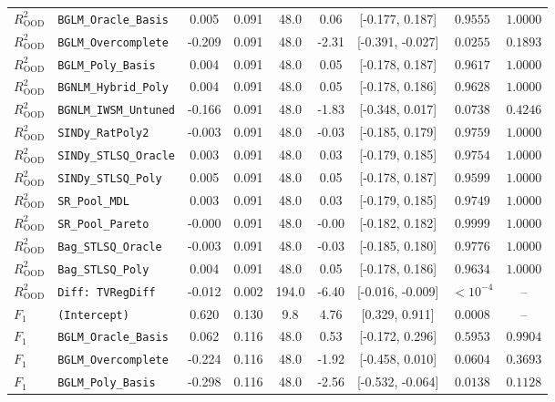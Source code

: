 \begin{table}[t]
\begin{tabular}{llccccccc}
$R^2_{\text{OOD}}$ & \texttt{BGLM\_Oracle\_Basis} & 0.005 & 0.091 & 48.0 & 0.06 & [-0.177, 0.187] & $0.9555$ & $1.0000$ \\
$R^2_{\text{OOD}}$ & \texttt{BGLM\_Overcomplete} & -0.209 & 0.091 & 48.0 & -2.31 & [-0.391, -0.027] & $0.0255$ & $0.1893$ \\
$R^2_{\text{OOD}}$ & \texttt{BGLM\_Poly\_Basis} & 0.004 & 0.091 & 48.0 & 0.05 & [-0.178, 0.187] & $0.9617$ & $1.0000$ \\
$R^2_{\text{OOD}}$ & \texttt{BGNLM\_Hybrid\_Poly} & 0.004 & 0.091 & 48.0 & 0.05 & [-0.178, 0.186] & $0.9628$ & $1.0000$ \\
$R^2_{\text{OOD}}$ & \texttt{BGNLM\_IWSM\_Untuned} & -0.166 & 0.091 & 48.0 & -1.83 & [-0.348, 0.017] & $0.0738$ & $0.4246$ \\
$R^2_{\text{OOD}}$ & \texttt{SINDy\_RatPoly2} & -0.003 & 0.091 & 48.0 & -0.03 & [-0.185, 0.179] & $0.9759$ & $1.0000$ \\
$R^2_{\text{OOD}}$ & \texttt{SINDy\_STLSQ\_Oracle} & 0.003 & 0.091 & 48.0 & 0.03 & [-0.179, 0.185] & $0.9754$ & $1.0000$ \\
$R^2_{\text{OOD}}$ & \texttt{SINDy\_STLSQ\_Poly} & 0.005 & 0.091 & 48.0 & 0.05 & [-0.178, 0.187] & $0.9599$ & $1.0000$ \\
$R^2_{\text{OOD}}$ & \texttt{SR\_Pool\_MDL} & 0.003 & 0.091 & 48.0 & 0.03 & [-0.179, 0.185] & $0.9749$ & $1.0000$ \\
$R^2_{\text{OOD}}$ & \texttt{SR\_Pool\_Pareto} & -0.000 & 0.091 & 48.0 & -0.00 & [-0.182, 0.182] & $0.9999$ & $1.0000$ \\
$R^2_{\text{OOD}}$ & \texttt{Bag\_STLSQ\_Oracle} & -0.003 & 0.091 & 48.0 & -0.03 & [-0.185, 0.180] & $0.9776$ & $1.0000$ \\
$R^2_{\text{OOD}}$ & \texttt{Bag\_STLSQ\_Poly} & 0.004 & 0.091 & 48.0 & 0.05 & [-0.178, 0.186] & $0.9634$ & $1.0000$ \\
$R^2_{\text{OOD}}$ & \texttt{Diff: TVRegDiff} & -0.012 & 0.002 & 194.0 & -6.40 & [-0.016, -0.009] & $< 10^{-4}$ & -- \\
\midrule
$F_1$ & \texttt{(Intercept)} & 0.620 & 0.130 & 9.8 & 4.76 & [0.329, 0.911] & $0.0008$ & -- \\
$F_1$ & \texttt{BGLM\_Oracle\_Basis} & 0.062 & 0.116 & 48.0 & 0.53 & [-0.172, 0.296] & $0.5953$ & $0.9904$ \\
$F_1$ & \texttt{BGLM\_Overcomplete} & -0.224 & 0.116 & 48.0 & -1.92 & [-0.458, 0.010] & $0.0604$ & $0.3693$ \\
$F_1$ & \texttt{BGLM\_Poly\_Basis} & -0.298 & 0.116 & 48.0 & -2.56 & [-0.532, -0.064] & $0.0138$ & $0.1128$ \\

\end{tabular}
\end{table}
